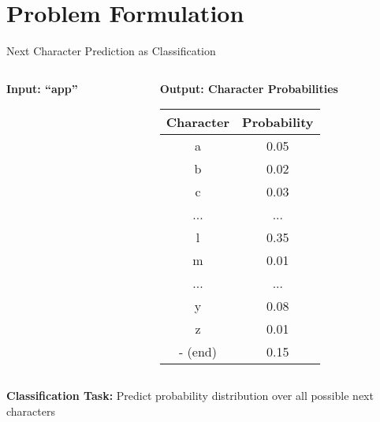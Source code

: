 \documentclass[usenames,dvipsnames]{beamer}
\begin{document}
\section{Problem Formulation}

\begin{frame}{Next Character Prediction as Classification}
\begin{columns}
\begin{column}{0.3\textwidth}
\begin{center}

\vspace{0.5cm}
\textbf{Input: ``app''}
\end{center}
\end{column}

\begin{column}{0.7\textwidth}
\begin{center}
\textbf{Output: Character Probabilities}
\vspace{0.3cm}

\begin{tabular}{|c|c|}
\hline
\textbf{Character} & \textbf{Probability} \\
\hline
a & 0.05 \\
b & 0.02 \\
c & 0.03 \\
... & ... \\
l & 0.35 \\
m & 0.01 \\
... & ... \\
y & 0.08 \\
z & 0.01 \\
- (end) & 0.15 \\
\hline
\end{tabular}
\end{center}
\end{column}
\end{columns}

\vspace{0.5cm}
\begin{center}
\textbf{Classification Task:} Predict probability distribution over all possible next characters
\end{center}
\end{frame}
\end{document}
